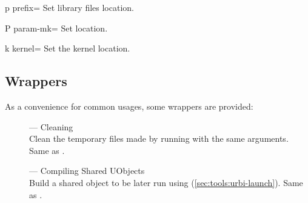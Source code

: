 \begin{options}
\item[p]{prefix=} Set library files location.
\item[P]{param-mk=} Set  location.
\item[k]{kernel=} Set the kernel location.
\end{options}


\subsection{ Wrappers}
\label{sec:tools:umake:wrappers}

As a convenience for common  usages, some wrappers are
provided:
\begin{description}
\item[] --- Cleaning\\
  Clean the temporary files made by running  with the
  same arguments.  Same as .
\item[] --- Compiling Shared UObjects\\
  Build a shared object to be later run using 
  (\autoref{sec:tools:urbi-launch}).  Same as .
\end{description}

